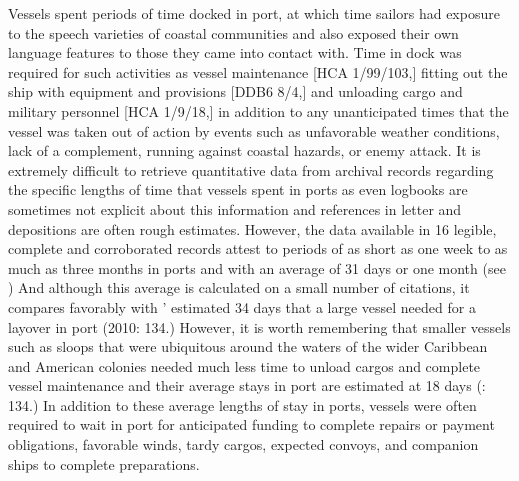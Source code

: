 Vessels spent periods of time docked in port, at which time sailors had exposure to the speech varieties of coastal communities and also exposed their own language features to those they came into contact with. Time in dock was required for such activities as vessel maintenance [HCA 1/99/103,] fitting out the ship with equipment and provisions [DDB6 8/4,] and unloading cargo and military personnel [HCA 1/9/18,] in addition to any unanticipated times that the vessel was taken out of action by events such as unfavorable weather conditions, lack of a  complement, running against coastal hazards, or enemy attack. It is extremely difficult to retrieve quantitative data from archival records regarding the specific lengths of time that vessels spent in ports as even logbooks are sometimes not explicit about this information and references in letter and depositions are often rough estimates. However, the data available in 16 legible, complete and corroborated records attest to periods of as short as one week to as much as three months in ports and with an average of 31 days or one month (see ) And although this average is calculated on a small number of citations, it compares favorably with \citeauthor{Jarvis2010}’ estimated 34 days that a large vessel needed for a layover in port (2010: 134.) However, it is worth remembering that smaller vessels such as sloops that were ubiquitous around the waters of the wider Caribbean and American colonies needed much less time to unload cargos and complete vessel maintenance and their average stays in port are estimated at 18 days (\citealt{Jarvis2010}: 134.) In addition to these average lengths of stay in ports, vessels were often required to wait in port for anticipated funding to complete repairs or payment obligations, favorable winds, tardy cargos, expected convoys, and companion ships to complete preparations. 

